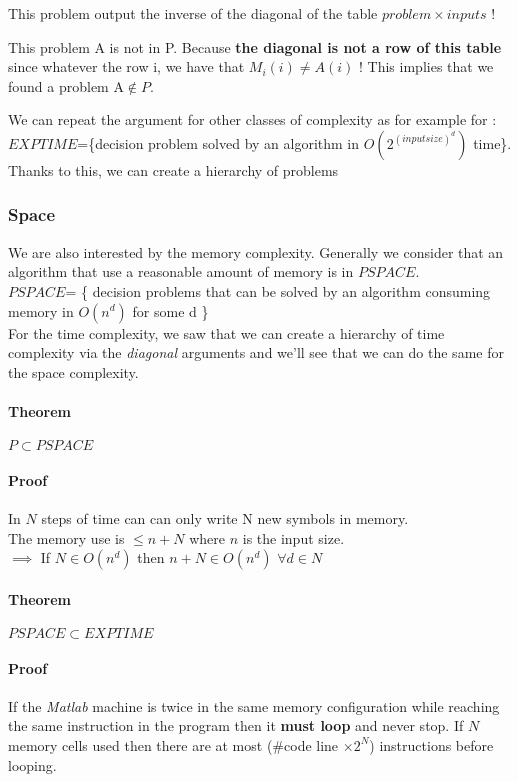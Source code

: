 This problem output the inverse of the diagonal of the table $problem \times inputs$ !

This problem A is not in P. Because \textbf{the diagonal is not a row of this table} since
whatever the row i, we have that $M_i(i) \neq A(i)$ ! This implies that we found a problem A$\notin P$.

We can repeat the argument for other classes of complexity as for example for : $EXPTIME$=\{decision problem solved by an algorithm in $O(2^{(input size)^d})$ time\}.
Thanks to this, we can create a hierarchy of problems

\subsubsection{Space}
We are also interested by the memory complexity. Generally we consider that an algorithm that use a reasonable amount of memory is in $PSPACE$. \\
$PSPACE$= \{
decision problems that can be solved by an algorithm consuming memory in $O(n^d)$ for some d \}\\
For the time complexity, we saw that we can create a hierarchy of time complexity via the \emph{diagonal} arguments and we'll see that we can do the same for the space complexity.

\paragraph{Theorem} $P \subset PSPACE$ 

\paragraph{Proof}
In $N$ steps of time can can only write N new symbols in memory. \\
The memory use is $\leq n + N$ where $n$ is the input size.\\
$\implies$ If  $N \in O(n^d)$ then $n+N\in O(n^d) $ $\forall d \in N$

\paragraph{Theorem} $PSPACE \subset EXPTIME$
\paragraph{Proof}
If the \emph{Matlab} machine is twice in the same memory configuration while reaching
the same instruction in the program then it \textbf{must loop} and never stop.
If $N$ memory cells used then there are at most ($\#$code line $\times 2^N$) instructions before looping.

